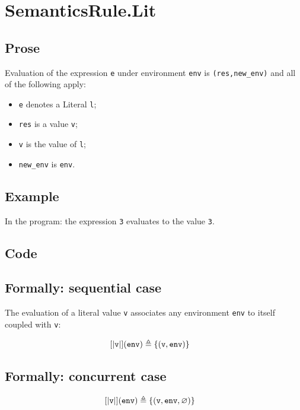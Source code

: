 \documentclass{book}
\begin{document}
\section{SemanticsRule.Lit \label{sec:SemanticsRule.Lit}}

  \subsection{Prose}
  Evaluation of the expression \texttt{e} under environment \texttt{env} is
  \texttt{(res,new\_env)} and all of the following apply:
  \begin{itemize}
  \item \texttt{e} denotes a Literal \texttt{l};
  \item \texttt{res} is a value \texttt{v};
  \item \texttt{v} is the value of \texttt{l};
  \item \texttt{new\_env} is \texttt{env}.
  \end{itemize}

  \subsection{Example}
  In the program:
  the expression \texttt{3} evaluates to the value \texttt{3}.

  \subsection{Code}

\begin{formal}
  \subsection{Formally: sequential case}
  The evaluation of a literal value \texttt{v} associates any environment
\texttt{env} to itself coupled with \texttt{v}: 

\begin{align}
  \left[| \texttt{v} \right|](\texttt{env}) & \triangleq \left\{ (\texttt{v}, \texttt{env}) \right\}
  \label{eq:sem-seq-lit}
  \end{align}

  \subsection{Formally: concurrent case}
  \begin{align}
  \left[| \texttt{v} \right|](\texttt{env}) & \triangleq \left\{ (\texttt{v}, \texttt{env}, \varnothing) \right\}
  \label{eq:sem-conc-lit}
  \end{align}
\end{formal}
\end{document}
